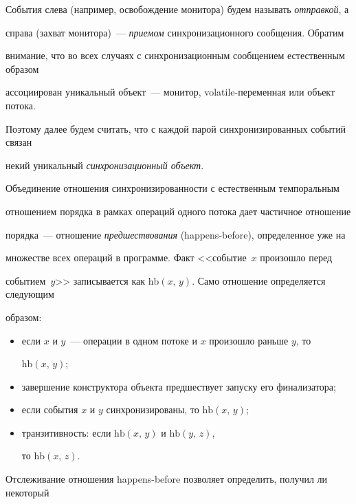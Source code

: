   События слева (например, освобождение монитора) будем называть \textit{отправкой}, а

справа (захват монитора)~--- \textit{приемом} синхронизационного сообщения. Обратим

внимание, что во всех случаях с синхронизационным сообщением естественным образом

ассоциирован уникальный объект~--- монитор, volatile-пе\-ре\-мен\-ная или объект потока.

Поэтому далее будем считать, что с каждой парой синхронизированных событий связан

некий уникальный \textit{синхронизационный объект}.



  Объединение отношения синхронизированности с естественным темпоральным

отношением порядка в рамках операций одного потока дает частичное отношение

  порядка~--- отношение \textit{предшествования} (happens-before), определенное уже на

множестве всех операций в программе. Факт <<событие~$x$ произошло перед

событием~$y$>> записывается как $\mathrm{hb}\left(x,\,y\right)$. Само отношение определяется следующим

образом:

  \begin{itemize}

\item если $x$ и $y$~--- операции в одном потоке и $x$ произошло раньше $y$, то

$\mathrm{hb}\left(x,\,y\right)$;

\item завершение конструктора объекта предшествует запуску его финализатора;

\item если события $x$ и $y$ синхронизированы, то $\mathrm{hb}\left(x,\,y\right)$;

\item транзитивность: если $\mathrm{hb}\left(x,\,y\right)$ и $\mathrm{hb}\left(y,\,z\right)$,

то $\mathrm{hb}\left (x,\,z\right)$.

\end{itemize}



  Отслеживание отношения happens-before позволяет определить, получил ли некоторый

